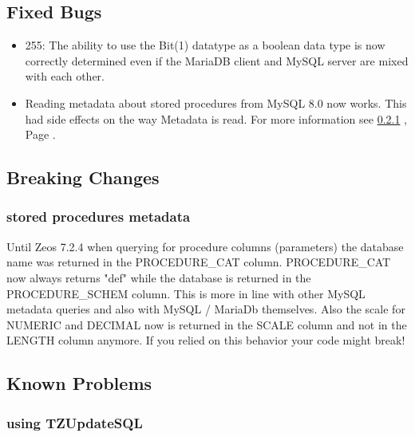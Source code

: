 \documentclass[a4paper,12pt,oneside]{book}
\begin{document}
\subsection{Fixed Bugs}
\label{sec:Rev6_MysqlMariadb_FixedBugs}

\begin{itemize}
\item 255:
  The ability to use the Bit(1) datatype as a boolean data type is now correctly determined even if the MariaDB client and MySQL server are mixed with each other.
\item 
  Reading metadata about stored procedures from MySQL 8.0 now works. This had side effects on the way Metadata is read.
	For more information see \ref{sec:Rev6_MysqlMariadb_BreakingChanges_StoredProcMetadata} , Page \pageref{sec:Rev6_MysqlMariadb_BreakingChanges_StoredProcMetadata}.
\end{itemize}

\subsection{Breaking Changes}
\label{sec:Rev6_MysqlMariadb_BreakingChanges}

\subsubsection{stored procedures metadata}
\label{sec:Rev6_MysqlMariadb_BreakingChanges_StoredProcMetadata}

Until Zeos 7.2.4 when querying for procedure columns (parameters) the database name was returned in the PROCEDURE\_CAT column.
PROCEDURE\_CAT now always returns "def" while the database is returned in the PROCEDURE\_SCHEM column.
This is more in line with other MySQL metadata queries and also with MySQL / MariaDb themselves.
Also the scale for NUMERIC and DECIMAL now is returned in the SCALE column and not in the LENGTH column anymore.
If you relied on this behavior your code might break!

\subsection{Known Problems}
\label{sec:Rev6_MysqlMariadb_KnownProblems}

\subsubsection{using TZUpdateSQL}
\label{sec:Rev6_MysqlMariadb_KnownProblems_TZUpdateSQL}
\end{document}
